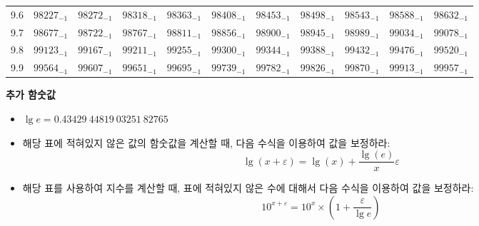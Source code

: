 \documentclass[10pt, a4paper]{article}
\begin{document}
\begin{center}
\begin{longtable}{c || c c c c c | c c c c c}
        9.6 & \({98227}_{-1}\) & \({98272}_{-1}\) & \({98318}_{-1}\) & \({98363}_{-1}\) & \({98408}_{-1}\) & \({98453}_{-1}\) & \({98498}_{-1}\) & \({98543}_{-1}\) & \({98588}_{-1}\) & \({98632}_{-1}\)\\
        9.7 & \({98677}_{-1}\) & \({98722}_{-1}\) & \({98767}_{-1}\) & \({98811}_{-1}\) & \({98856}_{-1}\) & \({98900}_{-1}\) & \({98945}_{-1}\) & \({98989}_{-1}\) & \({99034}_{-1}\) & \({99078}_{-1}\)\\
        9.8 & \({99123}_{-1}\) & \({99167}_{-1}\) & \({99211}_{-1}\) & \({99255}_{-1}\) & \({99300}_{-1}\) & \({99344}_{-1}\) & \({99388}_{-1}\) & \({99432}_{-1}\) & \({99476}_{-1}\) & \({99520}_{-1}\)\\
        9.9 & \({99564}_{-1}\) & \({99607}_{-1}\) & \({99651}_{-1}\) & \({99695}_{-1}\) & \({99739}_{-1}\) & \({99782}_{-1}\) & \({99826}_{-1}\) & \({99870}_{-1}\) & \({99913}_{-1}\) & \({99957}_{-1}\)\\
        \hline
    \end{longtable}
    
    \pagebreak
    \textbf{추가 함숫값}
    \begin{itemize}
        \item \(\lg{e}=0.43429\ 44819\ 03251\ 82765\)
        \item 
        해당 표에 적혀있지 않은 값의 함숫값을 계산할 때, 다음 수식을 이용하여 값을 보정하라:
        \[\lg\left(x+\varepsilon\right)=\lg\left(x\right)+\frac{\lg\left(e\right)}{x}\varepsilon\]
        \item 
        해당 표를 사용하여 지수를 계산할 때, 표에 적혀있지 않은 수에 대해서 다음 수식을 이용하여 값을 보정하라:
        \[{10}^{x+\varepsilon}={10}^{x} \times \left(1+\frac{\varepsilon}{\lg{e}}\right)\]
    \end{itemize}
\end{center}
\pagebreak
\end{document}
